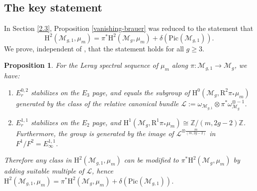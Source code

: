 \documentclass[12pt]{amsart}
\newtheorem{proposition}{Proposition}
\begin{document}
\subsection{The key statement} In Section \ref{2.3}, Proposition \ref{vanishing-brauer} was reduced to the statement that $$\mathrm{H}^2(\mathcal{M}_{g,1},\mu_m)=\pi^*\mathrm{H}^2(\mathcal{M}_g,\mu_m)+\delta(\mathrm{Pic}(\mathcal{M}_{g,1})).$$
We prove, independent of \cite[Theorem 4.1]{zbMATH07456405}, that the statement holds for all $g\geq3$.
\begin{proposition}\label{add}For the Leray spectral sequence of $\mu_m$ along $\pi\colon \mathcal{M}_{g,1}\to\mathcal{M}_g$, we have:
\begin{enumerate}
\item $E_r^{0,2}$ stabilizes on the $E_3$ page, and equals the subgroup of $\mathrm{H}^0(\mathcal{M}_{g},\mathrm{R}^2\pi_*\mu_m)$ generated by the class of the relative canonical bundle $\mathcal{L}:=\omega_{\mathcal{M}_{g,1}}\otimes\pi^*\omega_{\mathcal{M}_{g}}^{\otimes-1}$.
\item $E_r^{1,1}$ stabilizes on the $E_2$ page, and $\mathrm{H}^1(\mathcal{M}_g,\mathrm{R}^1\pi_*\mu_m)\cong\mathbb{Z}/(m,2g-2)\mathbb{Z}$. Furthermore, the group is generated by the image of $\mathcal{L}^{\otimes \frac{m}{(m,2g-2)}}$ in $F^1/F^2=E_\infty^{1,1}$.
\end{enumerate}
Therefore any class in $\mathrm{H}^2(\mathcal{M}_{g,1},\mu_m)$ can be modified to $\pi^*\mathrm{H}^2(\mathcal{M}_{g},\mu_m)$ by adding suitable multiple of $\mathcal{L}$, hence $\mathrm{H}^2(\mathcal{M}_{g,1},\mu_m)=\pi^*\mathrm{H}^2(\mathcal{M}_{g},\mu_m)+\delta(\mathrm{Pic}(\mathcal{M}_{g,1}))$.
\end{proposition}
\end{document}
